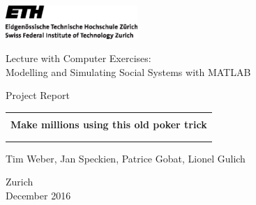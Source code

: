 
\thispagestyle{empty}

\begin{center}
\includegraphics[width=5cm]{ETHlogo.eps}

\bigskip


\bigskip


\bigskip


\LARGE{ 	Lecture with Computer Exercises:\\ }
\LARGE{ Modelling and Simulating Social Systems with MATLAB\\}

\bigskip

\bigskip

\small{Project Report}\\

\bigskip

\bigskip

\bigskip

\bigskip


\begin{tabular}{|c|}
\hline
\\
\textbf{\LARGE{Make millions using this old poker trick}}\\
\textbf{\LARGE{}}\\
\\
\hline
\end{tabular}
\bigskip

\bigskip

\bigskip

\LARGE{Tim Weber, Jan Speckien, Patrice Gobat, Lionel Gulich}



\bigskip

\bigskip

\bigskip

\bigskip

\bigskip

\bigskip

\bigskip

\bigskip

Zurich\\
December 2016\\

\end{center}


